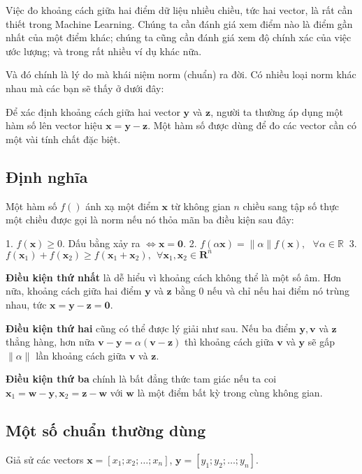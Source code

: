 Việc đo khoảng cách giữa hai điểm dữ liệu nhiều chiều, tức hai vector, là rất cần thiết trong Machine Learning. Chúng ta cần đánh giá xem điểm nào là điểm gần nhất của một điểm khác; chúng ta cũng cần đánh giá xem độ chính xác của việc ước lượng; và trong rất nhiều ví dụ khác nữa.  
 
Và đó chính là lý do mà khái niệm norm (chuẩn) ra đời. Có nhiều loại norm khác nhau mà các bạn sẽ thấy ở dưới đây:  
 
Để xác định khoảng cách giữa hai vector $\mathbf{y}$ và $\mathbf{z}$, người ta thường áp dụng một hàm số lên vector hiệu $\mathbf{x = y - z}$. Một hàm số được dùng để đo các vector cần có một vài tính chất đặc biệt.  
 
\subsection{Định nghĩa}
Một hàm số $f() $ ánh xạ một điểm $\mathbf{x}$ từ không gian $n$ chiều sang tập số thực một chiều được gọi là norm nếu nó thỏa mãn ba điều kiện sau đây: 
 
1. $f(\mathbf{x}) \geq 0$. Dấu bằng xảy ra $\Leftrightarrow \mathbf{x = 0} $. 
2. $f(\alpha \mathbf{x}) = \|\alpha\| f(\mathbf{x}), ~~~\forall \alpha \in \mathbb{R}\ $ 
3. $f(\mathbf{x}_1) + f(\mathbf{x}_2) \geq f(\mathbf{x}_1 + \mathbf{x}_2), ~~\forall \mathbf{x}_1, \mathbf{x}_2 \in \mathbf{R}^n$ 
 
\textbf{Điều kiện thứ nhất} là dễ hiểu vì khoảng cách không thể là một số âm. Hơn nữa, khoảng cách giữa hai điểm $\mathbf{y}$ và $\mathbf{z}$ bằng 0 nếu và chỉ nếu hai điểm nó trùng nhau, tức $\mathbf{x = y - z = 0} $. 
 
\textbf{Điều kiện thứ hai} cũng có thể được lý giải như sau. Nếu ba điểm $\mathbf{y, v}$ và $\mathbf{z}$ thẳng hàng, hơn nữa $\mathbf{v - y} = \alpha (\mathbf{v - z}) $ thì khoảng cách giữa $\mathbf{v}$ và $\mathbf{y}$ sẽ gấp $ \|\alpha \|$ lần khoảng cách giữa $\mathbf{v}$ và $\mathbf{z}$. 
 
\textbf{Điều kiện thứ ba} chính là bất đẳng thức tam giác nếu ta coi $\mathbf{x}_1 = \mathbf{ w - y}, \mathbf{x}_2 = \mathbf{z - w} $ với $\mathbf{w}$ là một điểm bất kỳ trong cùng không gian. 
 
 
 
\subsection{Một số chuẩn thường dùng}
 
Giả sử các vectors $\mathbf{x} = [x_1; x_2; \dots; x_n]$, $\mathbf{y} = [y_1; y_2; \dots; y_n]$. 
 
